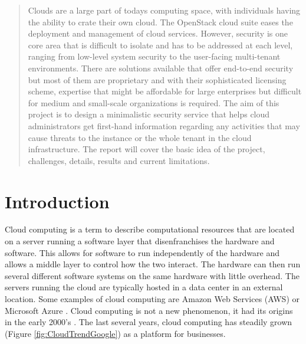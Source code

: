 \documentclass[12pt]{article}
\begin{document}

\newpage
\tableofcontents
\newpage

\begin{abstract}
Clouds are a large part of todays computing space, with individuals having the ability to crate their own cloud. The OpenStack cloud suite eases the deployment and management of cloud services. However, security is one core area that is difficult to isolate and has to be addressed at each level, ranging from low-level system security to the user-facing multi-tenant environments. There are solutions available that offer end-to-end security but most of them are proprietary and with their sophisticated licensing scheme, expertise that might be affordable for large enterprises but difficult for medium and small-scale organizations is required. The aim of this project is to design a minimalistic security service that helps cloud administrators get first-hand information regarding any activities that may cause threats to the instance or the whole tenant in the cloud infrastructure. The report will cover the basic idea of the project, challenges, details, results and current limitations.
\end{abstract}

\section{Introduction}
Cloud computing is a term to describe computational resources that are located on a server running a software layer that disenfranchises the hardware and software. This allows for software to run independently of the hardware and allows a middle layer to control how the two interact. The hardware can then run several different software systems on the same hardware with little overhead. The servers running the cloud are typically hosted in a data center in an external location. Some examples of cloud computing are Amazon Web Services (AWS) \cite{amazonAWS} or Microsoft Azure \cite{Azure}. Cloud computing is not a new phenomenon\cite{rochwerger2009reservoir}, it had its origins in the early 2000's \cite{rochwerger2009reservoir}. The last several years, cloud computing has steadily grown (Figure \ref{fig:CloudTrendGoogle}) as a platform for businesses.
\end{document}
